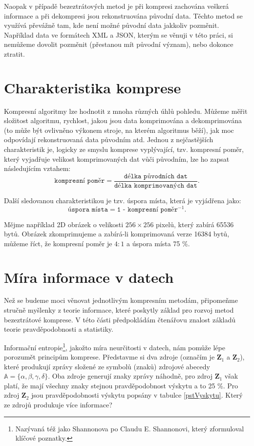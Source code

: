 Naopak v případě bezeztrátových metod je při kompresi zachována veškerá informace a při dekompresi
jsou rekonstruována původní data. Těchto metod se využívá převážně tam, kde není možné původní data jakkoliv pozměnit. Například data ve formátech XML a JSON, kterým se věnuji v této práci, si nemůžeme dovolit pozměnit (přestanou mít původní význam), nebo dokonce ztratit.

\section{Charakteristika komprese}
Kompresní algoritmy lze hodnotit z mnoha různých úhlů pohledu. Můžeme měřit složitost algoritmu, rychlost, jakou jsou data komprimována a dekomprimována (to může být ovlivněno výkonem stroje, na kterém algoritmus běží), jak moc odpovídají rekonstruovaná data původním atd.
Jednou z nejčastějších charakteristik je, logicky ze smyslu komprese vy\-plý\-va\-jí\-cí, tzv. kompresní poměr, který vyjadřuje velikost komprimovaných dat vůči původním, lze ho zapsat následujícím  vztahem:
\begin{equation}
\texttt{kompresní poměr} = \frac{\texttt{délka původních dat}}{\texttt{délka komprimovaných dat}}.
\end{equation}

Další sledovanou charakteristikou je tzv. úspora místa, která je vyjádřena jako:
\begin{equation}
\texttt{úspora místa} = \texttt{1 - kompresní poměr$^{-1}$}.
\end{equation}

Mějme například 2D obrázek o velikosti $256\times256$ pixelů, který zabírá 65536 bytů. Obrázek zkomprimujeme a zabírá-li komprimovaná verze 16384 bytů, můžeme říct, že kompresní poměr je $4:1$ a úspora místa 75 \%. 

\section{Míra informace v datech}
Než se budeme moci věnovat jednotlivým kompresním metodám, připomeňme stručně myšlenky z teorie informace, které poskytly základ pro rozvoj metod bezeztrátové komprese. V této části předpokládám čtenářovu znalost základů teorie pravděpodobnosti a statistiky.

Informační entropie\footnote{Nazývaná též jako Shannonova po Claudu E. Shannonovi, který zformuloval klíčové poznatky.}, jakožto míra neurčitosti v datech, nám pomůže lépe porozumět principům komprese. Představme si dva zdroje (označím je $\mathbf{Z}_1$ a $\mathbf{Z}_2$), které produkují zprávy složené ze symbolů (znaků) zdrojové abecedy $\mathbb{A} = \{\alpha, \beta, \gamma, \delta\}$. Oba zdroje generují znaky zprávy náhodně, pro zdroj $\mathbf{Z}_1$ však platí, že mají všechny znaky stejnou pravděpodobnost výskytu a to 25 \%. Pro zdroj $\mathbf{Z}_2$ jsou pravděpodobnosti výskytu popsány v tabulce \ref{pstVyskytu}. Který ze zdrojů produkuje více informace?

